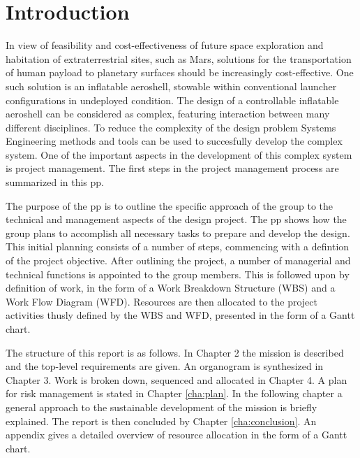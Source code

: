\section{Introduction}\label{cha:introduction}
In view of feasibility and cost-effectiveness of future space exploration and habitation of extraterrestrial sites, such as Mars, solutions for the transportation of human payload to planetary surfaces should be increasingly cost-effective. One such solution is an inflatable aeroshell, stowable within conventional launcher configurations in undeployed condition. The design of a controllable inflatable aeroshell can be considered as complex, featuring interaction between many different disciplines. To reduce the complexity of the design problem Systems Engineering methods and tools can be used to succesfully develop the complex system. One of the important aspects in the development of this complex system is project management. The first steps in the project management process are summarized in this \gls{pp}.

The purpose of the \gls{pp} is to outline the specific approach of the group to the technical and management aspects of the design project. The \gls{pp} shows how the group plans to accomplish all necessary tasks to prepare and develop the design. This initial planning consists of a number of steps, commencing with a defintion of the project objective. After outlining the project, a number of managerial and technical functions is appointed to the group members. This is followed upon by definition of work, in the form of a Work Breakdown Structure (WBS) and a Work Flow Diagram (WFD). Resources are then allocated to the project activities thusly defined by the WBS and WFD, presented in the form of a Gantt chart.

The structure of this report is as follows. In Chapter 2 the mission is described and the top-level requirements are given. An organogram is synthesized in Chapter 3. Work is broken down, sequenced and allocated in Chapter 4. A plan for risk management is stated in Chapter \ref{cha:plan}.  In the following chapter a general approach to the sustainable development of the mission is briefly explained. The report is then concluded by Chapter \ref{cha:conclusion}. An appendix gives a detailed overview of resource allocation in the form of a Gantt chart.